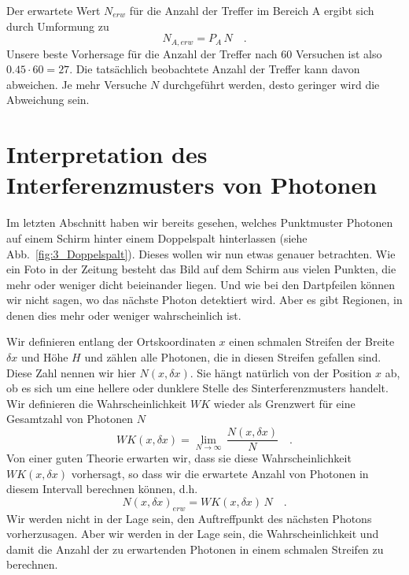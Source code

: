 Der erwartete Wert $N_{erw}$ für die Anzahl der Treffer im Bereich A ergibt sich durch Umformung zu 
\begin{equation}
    N_{A, erw} = P_A \, N \quad .
\end{equation}
Unsere beste Vorhersage für die Anzahl der Treffer nach 60 Versuchen ist also $0.45 \cdot 60 = 27 $. Die tatsächlich beobachtete Anzahl der Treffer kann davon abweichen. Je mehr Versuche $N$ durchgeführt werden, desto geringer wird die Abweichung sein.



\section{Interpretation des Interferenzmusters von Photonen}

Im letzten Abschnitt haben wir bereits gesehen, welches Punktmuster Photonen auf einem Schirm hinter einem Doppelspalt hinterlassen (siehe Abb.~\ref{fig:3_Doppelspalt}). Dieses wollen wir nun etwas genauer betrachten. Wie ein Foto in der Zeitung besteht das Bild auf dem Schirm aus vielen Punkten, die mehr oder weniger dicht beieinander liegen. Und wie bei den Dartpfeilen können wir nicht sagen, wo das nächste Photon detektiert wird. Aber es gibt Regionen, in denen dies mehr oder weniger wahrscheinlich ist.

Wir definieren entlang der Ortskoordinaten $x$ einen schmalen Streifen der Breite $\delta x$ und Höhe $H$ und zählen alle Photonen, die in diesen Streifen gefallen sind. Diese Zahl nennen wir hier $N(x, \delta x)$. Sie hängt natürlich von der Position $x$ ab, ob es sich um eine hellere oder dunklere Stelle des Sinterferenzmusters handelt. Wir definieren die Wahrscheinlichkeit $WK$ wieder als Grenzwert für eine Gesamtzahl von Photonen $N$
\begin{equation}
    WK(x, \delta x) = \lim_{N \rightarrow \infty} \, \frac{N(x, \delta x)}{N} \quad .
\end{equation}
Von einer guten Theorie erwarten wir, dass sie diese Wahrscheinlichkeit $WK(x, \delta x)$ vorhersagt, so dass wir die erwartete Anzahl von Photonen in diesem Intervall berechnen können, d.h. 
\begin{equation}
    N(x, \delta x)_{ erw} = WK(x, \delta x) \, N \quad .
\end{equation}
Wir werden nicht in der Lage sein, den Auftreffpunkt des nächsten Photons vorherzusagen. Aber wir werden in der Lage sein, die Wahrscheinlichkeit und damit die Anzahl der zu erwartenden Photonen in einem schmalen Streifen zu berechnen.


